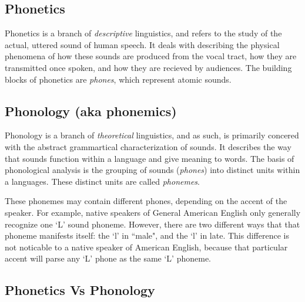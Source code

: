 \subsection{Phonetics}
\label{vocab:phonetics}
Phonetics is a branch of \emph{descriptive} linguistics, and refers to the study of the actual, uttered sound of human speech. It deals with describing the physical phenomena of how these sounds are produced from the vocal tract, how they are transmitted once spoken, and how they are recieved by audiences. The building blocks of phonetics are \emph{phones}, which represent atomic sounds.

\subsection{Phonology (aka phonemics)}
\label{vocab:phonology}
Phonology is a branch of \emph{theoretical} linguistics, and as such, is primarily concered with the abstract grammartical characterization of sounds.  It describes the way that sounds function within a language and give meaning to words.  The basis of phonological analysis is the grouping of sounds (\emph{phones}) into distinct units within a languages.  These distinct units are called \emph{phonemes}.  

These phonemes may contain different phones, depending on the accent of the speaker.  For example, native speakers of General American English only generally recognize one `L' sound phoneme. However, there are two different ways that that phoneme manifests itself: the `l' in ``male", and the `l' in late. This difference is not noticable to a native speaker of American English, because that particular accent will parse any `L' phone as the same `L' phoneme.

\subsection{Phonetics Vs Phonology}
\label{vocab:phoneticsVsPhonemics}

